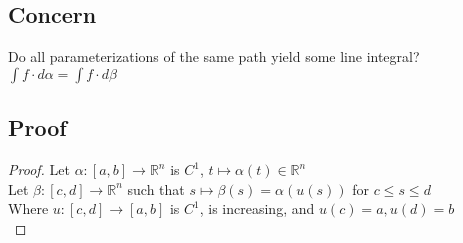 \documentclass[12pt]{article}
\newcommand{\BR}{\mathbb R}
\begin{document}
  \subsection{Concern}
    Do all parameterizations of the same path yield some line integral? \\
    $\int f\cdot d\alpha=\int f\cdot d\beta$ \\
  \subsection{Proof}
    \begin{proof}
      Let $\alpha:[a,b]\rightarrow\BR^n$ is $C^1$, $t\mapsto\alpha(t)\in\BR^n$ \\
      Let $\beta:[c,d]\rightarrow\BR^n$ such that $s\mapsto\beta(s)=\alpha(u(s))$ for $c\leq s\leq d$ \\
      Where $u:[c,d]\rightarrow[a,b]$ is $C^1$, is increasing, and $u(c)=a, u(d)=b$ \\
    \end{proof}
\end{document}

